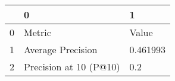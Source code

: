 \begin{tabular}{lll}
\toprule
{} &                       0 &         1 \\
\midrule
0 &                  Metric &     Value \\
1 &       Average Precision &  0.461993 \\
2 &  Precision at 10 (P@10) &       0.2 \\
\bottomrule
\end{tabular}
